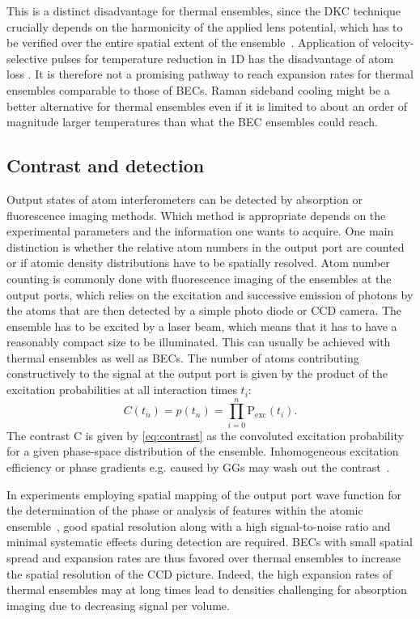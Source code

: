 This is a distinct disadvantage for thermal ensembles, since the DKC technique crucially depends on the harmonicity of the applied lens potential, which has to be verified over the entire spatial extent of the ensemble~\cite{Rudolph2015}.
Application of velocity-selective pulses for temperature reduction in 1D has the disadvantage of atom loss \cite{Kasevich1991}. It is therefore not a promising pathway to reach expansion rates for thermal ensembles comparable to those of BECs. Raman sideband cooling \cite{Hamann1998,Vuleti1998,Estey2015} might be a better alternative for thermal ensembles even if it is limited to about an order of magnitude larger temperatures than what the BEC ensembles could reach.
%
\subsection{Contrast and detection}
Output states of atom interferometers can be detected by absorption or fluorescence imaging methods.
Which method is appropriate depends on the experimental parameters and the information one wants to acquire.
One main distinction is whether the relative atom numbers in the output port are counted or if atomic density distributions have to be spatially resolved.
Atom number counting is commonly done with fluorescence imaging of the ensembles at the output ports, which relies on the excitation and successive emission of photons by the atoms that are then detected by a simple photo diode or CCD ca\-me\-ra.
The ensemble has to be excited by a laser beam, which means that it has to have a reasonably compact size to be illuminated.
This can usually be achieved with thermal ensembles as well as BECs.
The number of atoms contributing constructively to the signal at the output port is given by the product of the excitation probabilities at all interaction times $t_i$:
\begin{equation}
    \label{eq:contrast}
    C(t_n)=p(t_n)=\prod\limits_{i = 0}^{n}\text{P}_\text{exc}(t_i).
\end{equation}
The contrast C is given by \autoref{eq:contrast} as the convoluted excitation probability for a given phase-space distribution of the ensemble. Inhomogeneous excitation efficiency or phase gradients e.g. caused by GGs may wash out the contrast~\cite{Aguilera2014}.

In experiments employing spatial mapping of the output port wave function for the determination of the phase or analysis of features within the atomic ensemble~\cite{Sugarbaker2013}, good spatial resolution along with a high signal-to-noise ratio and minimal systematic effects during detection are required.
BECs with small spatial spread and expansion rates are thus favored over thermal ensembles to increase the spatial resolution of the CCD picture.
Indeed, the high expansion rates of thermal ensembles may at long times lead to densities challenging for absorption imaging due to decreasing signal per volume.
%